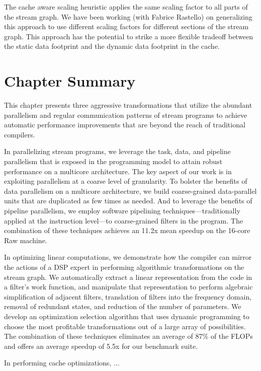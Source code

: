 The cache aware scaling heuristic applies the same scaling factor to
all parts of the stream graph.  We have been working (with Fabrice
Rastello) on generalizing this approach to use different scaling
factors for different sections of the stream graph.  This approach has
the potential to strike a more flexible tradeoff between the static
data footprint and the dynamic data footprint in the cache.

\section{Chapter Summary}

This chapter presents three aggressive transformations that utilize
the abundant parallelism and regular communication patterns of stream
programs to achieve automatic performance improvements that are beyond
the reach of traditional compilers.

In parallelizing stream programs, we leverage the task, data, and
pipeline parallelism that is exposed in the programming model to
attain robust performance on a multicore architecture.  The key aspect
of our work is in exploiting parallelism at a coarse level of
granularity.  To bolster the benefits of data parallelism on a
multicore architecture, we build coarse-grained data-parallel units
that are duplicated as few times as needed.  And to leverage the
benefits of pipeline parallelism, we employ software pipelining
techniques---traditionally applied at the instruction level---to
coarse-grained filters in the program.  The combination of these
techniques achieves an 11.2x mean speedup on the 16-core Raw machine.

In optimizing linear computations, we demonstrate how the compiler can
mirror the actions of a DSP expert in performing algorithmic
transformations on the stream graph.  We automatically extract a
linear representation from the code in a filter's work function, and
manipulate that representation to perform algebraic simplification of
adjacent filters, translation of filters into the frequency domain,
removal of redundant states, and reduction of the number of
parameters.  We develop an optimization selection algorithm that uses
dynamic programming to choose the most profitable transformations out
of a large array of possibilities.  The combination of these
techniques eliminates an average of 87\% of the FLOPs and offers an
average speedup of 5.5x for our benchmark suite.

In performing cache optimizations, ...

